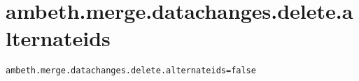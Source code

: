 \section{ambeth.merge.datachanges.delete.alternateids}
\label{configuration:AmbethMergeDatachangesDeleteAlternateids}
\ClearAPI
\TODO
{}
\begin{lstlisting}[style=Props,caption={Usage example for \textit{ambeth.merge.datachanges.delete.alternateids}}]
ambeth.merge.datachanges.delete.alternateids=false
\end{lstlisting}
